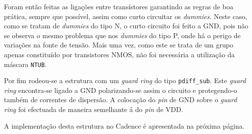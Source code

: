 \documentclass[11pt]{article}
\numberwithin{equation}{section}
\begin{document}
Foram então feitas as ligações entre transístores garantindo as regras de boa prática, sempre que possível, assim como curto circuitar os \textit{dummies}. Neste caso, como se tratam de \textit{dummies} do tipo N, o curto circuito foi feito a GND, pois não se observa o mesmo problema que nos \textit{dummies} do tipo P, onde há o perigo de variações na fonte de tensão. Mais uma vez, como este se trata de um grupo apenas constituído por transistores NMOS, não foi necessária a utilização da máscara \texttt{NTUB}.

Por fim rodeou-se a estrutura com um \textit{guard ring} do tipo \texttt{pdiff\_sub}. Este \textit{guard ring} encontra-se ligado a GND polarizando-se assim o circuito e protegendo-o também de correntes de dispersão. A colocação do \textit{pin} de GND sobre o \textit{guard ring} foi efectuada de maneira semelhante â do \textit{pin} de VDD.

A implementação desta estrutura no Cadence é apresentada na próxima página.

\pagebreak
\end{document}
